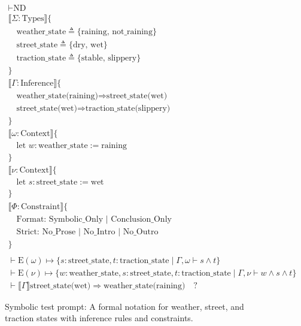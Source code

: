 \begin{figure}[h]
  \begin{tcolorbox}[title=Symbolic test prompt, colback=white, colframe=black]


\[
\begin{array}{l}
\vdash \text{ND} \\
\llbracket \Sigma : \text{Types} \rrbracket \{ \\
\quad \text{weather\_state} \triangleq \{ \text{raining, not\_raining} \} \\
\quad \text{street\_state} \triangleq \{ \text{dry, wet} \} \\
\quad \text{traction\_state} \triangleq \{ \text{stable, slippery} \} \\
\} \\
\llbracket \Gamma : \text{Inference} \rrbracket \{ \\
\quad \text{weather\_state(raining)} \Rightarrow \text{street\_state(wet)} \\
\quad \text{street\_state(wet)} \Rightarrow \text{traction\_state(slippery)} \\
\} \\
\llbracket \omega : \text{Context} \rrbracket \{ \\
\quad \text{let } w : \text{weather\_state} := \text{raining} \\
\} \\
\llbracket \nu : \text{Context} \rrbracket \{ \\
\quad \text{let } s : \text{street\_state} := \text{wet} \\
\} \\
\llbracket \Phi : \text{Constraint} \rrbracket \{ \\
\quad \text{Format: Symbolic\_Only } | \text{ Conclusion\_Only} \\
\quad \text{Strict: No\_Prose } | \text{ No\_Intro } | \text{ No\_Outro} \\
\} \\
\\
\vdash \text{E}(\omega) \mapsto \{ s : \text{street\_state}, t : \text{traction\_state} \mid \Gamma, \omega \vdash s \wedge t \} \\
\vdash \text{E}(\nu) \mapsto \{ w : \text{weather\_state}, s : \text{street\_state}, t : \text{traction\_state} \mid \Gamma, \nu \vdash w \wedge s \wedge t \} \\
\vdash \llbracket \Gamma \rrbracket \text{street\_state(wet)} \Rightarrow \text{weather\_state(raining)} \quad \text{?}
\end{array}
\]

  \end{tcolorbox}
  \caption{Symbolic test prompt: A formal notation for weather, street, and traction states with inference rules and constraints.}
  \label{fig:symbolic-test-prompt}
\end{figure}

